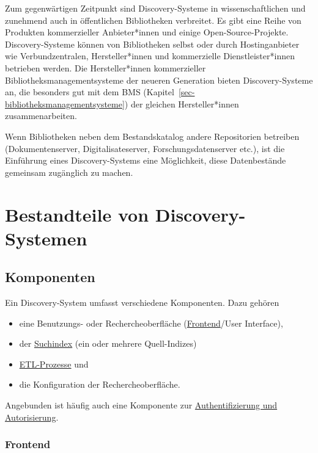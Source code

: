 \documentclass[
  11pt,
  letterpaper,
  DIV=11,
  twoside]{scrreprt}
\begin{document}
Zum gegenwärtigen Zeitpunkt sind Discovery-Systeme in wissenschaftlichen
und zunehmend auch in öffentlichen Bibliotheken verbreitet. Es gibt eine
Reihe von Produkten kommerzieller Anbieter*innen und einige
Open-Source-Projekte. Discovery-Systeme können von Bibliotheken selbst
oder durch Hostinganbieter wie Verbundzentralen, Hersteller*innen und
kommerzielle Dienstleister*innen betrieben werden. Die Hersteller*innen
kommerzieller Bibliotheksmanagementsysteme der neueren Generation bieten
Discovery-Systeme an, die besonders gut mit dem BMS
(Kapitel~\ref{sec-bibliotheksmanagementsysteme}) der gleichen
Hersteller*innen zusammenarbeiten.

Wenn Bibliotheken neben dem Bestandskatalog andere Repositorien
betreiben (Dokumentenserver, Digitalisateserver, Forschungsdatenserver
etc.), ist die Einführung eines Discovery-Systems eine Möglichkeit,
diese Datenbestände gemeinsam zugänglich zu machen.

\section{Bestandteile von
Discovery-Systemen}\label{bestandteile-von-discovery-systemen}

\subsection{Komponenten}\label{komponenten}

Ein Discovery-System umfasst verschiedene Komponenten. Dazu gehören

\begin{itemize}
\item
  eine Benutzungs- oder Rechercheoberfläche
  (\hyperref[frontend]{Frontend}/User Interface),
\item
  der \hyperref[suchindex]{Suchindex} (ein oder mehrere Quell-Indizes)
\item
  \hyperref[etl-prozess]{ETL-Prozesse} und
\item
  die Konfiguration der Rechercheoberfläche.
\end{itemize}

Angebunden ist häufig auch eine Komponente zur
\hyperref[authentifizierung-und-autorisierung]{Authentifizierung und
Autorisierung}.

\subsubsection{Frontend}\label{frontend}
\end{document}
